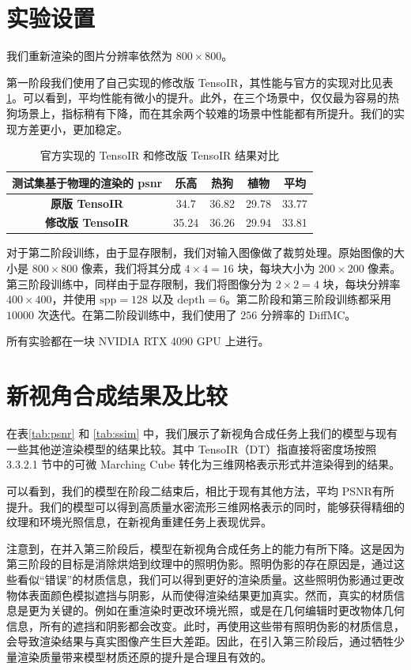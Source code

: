 \section{实验设置}

我们重新渲染的图片分辨率依然为 $800 \times 800$。

第一阶段我们使用了自己实现的修改版 TensoIR，其性能与官方的实现对比见表\ref{tab:tensoir}。可以看到，平均性能有微小的提升。此外，在三个场景中，仅仅最为容易的热狗场景上，指标稍有下降，而在其余两个较难的场景中性能都有所提升。我们的实现方差更小，更加稳定。
\begin{table}[h]
  \centering
  \begin{tabular}{ccccc}
  \toprule
  \textbf{测试集基于物理的渲染的 psnr} & 乐高  & 热狗 & 植物 & 平均 \\
  \midrule
  \textbf{原版 TensoIR}   & 34.7  & 36.82  & 29.78 & 33.77 \\
  \textbf{修改版 TensoIR} & 35.24 & 36.26  & 29.94 & 33.81 \\
  \bottomrule
  \end{tabular}
  \caption{官方实现的 TensoIR 和修改版 TensoIR 结果对比}
  \label{tab:tensoir}
\end{table}

对于第二阶段训练，由于显存限制，我们对输入图像做了裁剪处理。原始图像的大小是 $800 \times 800$ 像素，我们将其分成 $4 \times 4 = 16$ 块，每块大小为 $200 \times 200$ 像素。第三阶段训练中，同样由于显存限制，我们将图像分为 $2\times 2=4$ 块，每块分辨率 $400 \times 400$，并使用 $\text{spp}=128$ 以及 $\mathrm{depth}=6$。第二阶段和第三阶段训练都采用 $10000$ 次迭代。在第二阶段训练中，我们使用了 $256$ 分辨率的 DiffMC。

所有实验都在一块 NVIDIA RTX 4090 GPU 上进行。

\section {新视角合成结果及比较}

在表\ref{tab:psnr} 和 \ref{tab:ssim} 中，我们展示了新视角合成任务上我们的模型与现有一些其他逆渲染模型的结果比较。其中 TensoIR（DT）指直接将密度场按照 3.3.2.1 节中的可微 Marching Cube 转化为三维网格表示形式并渲染得到的结果。

可以看到，我们的模型在阶段二结束后，相比于现有其他方法，平均 PSNR有所提升。我们的模型可以得到高质量水密流形三维网格表示的同时，能够获得精细的纹理和环境光照信息，在新视角重建任务上表现优异。

注意到，在并入第三阶段后，模型在新视角合成任务上的能力有所下降。这是因为第三阶段的目标是消除烘焙到纹理中的照明伪影。照明伪影的存在原因是，通过这些看似“错误”的材质信息，我们可以得到更好的渲染质量。这些照明伪影通过更改物体表面颜色模拟遮挡与阴影，从而使得渲染结果更加真实。然而，真实的材质信息是更为关键的。例如在重渲染时更改环境光照，或是在几何编辑时更改物体几何信息，所有的遮挡和阴影都会改变。此时，再使用这些带有照明伪影的材质信息，会导致渲染结果与真实图像产生巨大差距。因此，在引入第三阶段后，通过牺牲少量渲染质量带来模型材质还原的提升是合理且有效的。

